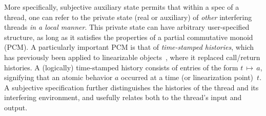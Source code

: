 %



More specifically, subjective auxiliary state permits that within a
spec of a thread, one can refer to the private state (real or
auxiliary) of \emph{other} interfering threads \emph{in a local
  manner}. This private state can have arbitrary user-specified
structure, as long as it satisfies the properties of a partial
commutative monoid (PCM).
%
A particularly important PCM is that of \emph{time-stamped histories},
which has previously been applied to linearizable
objects~\cite{Sergey-al:ESOP15}, where it replaced call/return
histories. A (logically) time-stamped history consists of entries of
the form $t\,{\mapsto}\,a$, signifying that an atomic behavior $a$
occurred at a time (or linearization point)~$t$. A subjective
specification further distinguishes the histories of the thread and
its interfering environment, and usefully relates both to the thread's
input and output.

